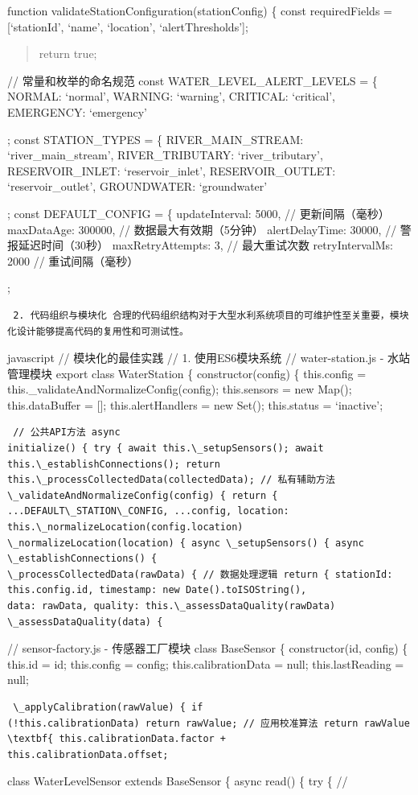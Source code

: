 {{{{{{{\begin{quote}
\end{quote}
function validateStationConfiguration(stationConfig) \{ const requiredFields = {[}`stationId', `name', `location',
`alertThresholds'{]}; \begin{quote}
 return true; 
\end{quote} // 常量和枚举的命名规范 const WATER\_LEVEL\_ALERT\_LEVELS = \{
NORMAL: `normal', WARNING: `warning', CRITICAL: `critical', EMERGENCY: `emergency' }; const STATION\_TYPES = \{
RIVER\_MAIN\_STREAM: `river\_main\_stream', RIVER\_TRIBUTARY: `river\_tributary', RESERVOIR\_INLET: `reservoir\_inlet',
RESERVOIR\_OUTLET: `reservoir\_outlet', GROUNDWATER: `groundwater' }; const DEFAULT\_CONFIG = \{ updateInterval: 5000,
// 更新间隔（毫秒） maxDataAge: 300000, // 数据最大有效期（5分钟） alertDelayTime: 30000, // 警报延迟时间（30秒） maxRetryAttempts: 3, // 最大重试次数
retryIntervalMs: 2000 // 重试间隔（毫秒） }; \begin{lstlisting} 2. 代码组织与模块化 合理的代码组织结构对于大型水利系统项目的可维护性至关重要，模块化设计能够提高代码的复用性和可测试性。
\end{lstlisting} javascript // 模块化的最佳实践 // 1. 使用ES6模块系统 // water-station.js - 水站管理模块 export class WaterStation \{
constructor(config) \{ this.config = this.\_validateAndNormalizeConfig(config); this.sensors = new Map();
this.dataBuffer = {[}{]}; this.alertHandlers = new Set(); this.status = `inactive'; } \begin{verbatim} // 公共API方法 async
initialize() { try { await this.\_setupSensors(); await this.\_establishConnections(); return
this.\_processCollectedData(collectedData); // 私有辅助方法 \_validateAndNormalizeConfig(config) { return {
...DEFAULT\_STATION\_CONFIG, ...config, location: this.\_normalizeLocation(config.location)
\_normalizeLocation(location) { async \_setupSensors() { async \_establishConnections() {
\_processCollectedData(rawData) { // 数据处理逻辑 return { stationId: this.config.id, timestamp: new Date().toISOString(),
data: rawData, quality: this.\_assessDataQuality(rawData) \_assessDataQuality(data) { \end{verbatim} //
sensor-factory.js - 传感器工厂模块 class BaseSensor \{ constructor(id, config) \{ this.id = id; this.config = config;
this.calibrationData = null; this.lastReading = null; } \begin{verbatim} \_applyCalibration(rawValue) { if
(!this.calibrationData) return rawValue; // 应用校准算法 return rawValue \textbf{ this.calibrationData.factor +
this.calibrationData.offset; \end{verbatim} class WaterLevelSensor extends BaseSensor \{ async read() \{ try \{ //
}}
